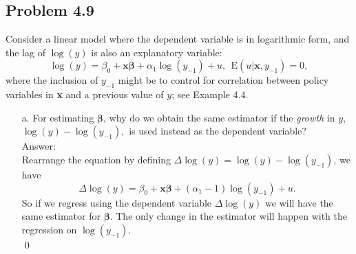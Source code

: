 \documentclass[10pt]{article}
\newcommand{\E}{\text{E}}
\begin{document}
\subsection*{Problem 4.9}
Consider a linear model where the dependent variable is in logarithmic form, and the lag of $\log(y)$ is also an explanatory variable:
\[\log(y)=\beta_0+\textbf{x}\pmb{\beta}+\alpha_1\log(y_{-1})+u,\ \ \E(u|\textbf{x},y_{-1})=0,\]
where the inclusion of $y_{-1}$ might be to control for correlation between policy variables in \textbf{x} and a previous value of $y$; see Example 4.4.
\begin{enumerate}
\item[a.] For estimating $\pmb{\beta}$, why do we obtain the same estimator if the \textit{growth} in $y$, $\log(y)-\log(y_{-1}),$ is used instead as the dependent variable?
\\ Answer: \\
Rearrange the equation by defining $\Delta \log(y)=\log(y)-\log(y_{-1})$, we have
\[\Delta \log(y)=\beta_0+\textbf{x}\pmb{\beta}+(\alpha_1-1)\log(y_{-1})+u.\]
So if we regress using the dependent variable $\Delta \log(y)$ we will have the same estimator for $\pmb{\beta}$. The only change in the estimator will happen with the regression on $\log(y_{-1}).$ \\ \qed


\end{enumerate}
\end{document}
